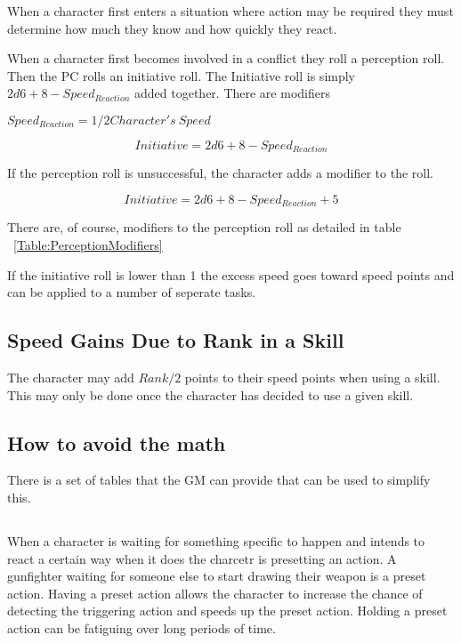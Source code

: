 When a character first enters a situation where action may be required they must determine
how much they know and how quickly they react.

When a character first becomes involved in a conflict they roll a perception roll. Then the PC rolls an initiative roll. The 
Initiative roll is simply $ 2d6 + 8 - Speed_{Reaction} $ added together. There are modifiers 

$ Speed_{Reaction} = 1/2 {Character's\ Speed } $

\[{Initiative} = 2d6 + 8 - Speed_{Reaction}\]

If the perception roll is unsuccessful, the character adds a modifier 
to the roll. 

\[{Initiative} = 2d6 + 8 - Speed_{Reaction} + 5\]

There are, of course, modifiers to the perception roll as detailed in table 
~\ref{Table:PerceptionModifiers}

If the initiative roll is lower than 1 the excess speed goes toward speed points 
and can be applied to a number of seperate tasks.

\subsection{Speed Gains Due to Rank in a Skill}

The character may add \( Rank/2 \) points to their speed points when using a
skill. This may only be done once the character has decided to use a
given skill. 

\subsection{How to avoid the math}

There is a set of tables that the GM can provide that can be used to
simplify this. 

\subsection{}

When a character is waiting for something specific to happen and intends to react a certain 
way when it does the charcetr is presetting an action. A gunfighter waiting for someone else 
to start drawing their weapon is a preset action. Having a preset action allows the character to increase
the chance of detecting the triggering action and speeds up the preset action. 
Holding a preset action can be fatiguing over long periods of time.

